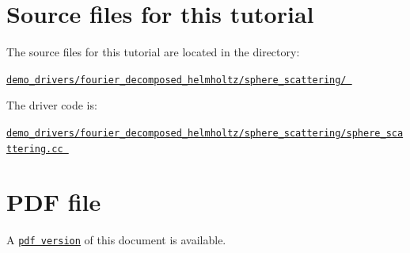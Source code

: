  

\hypertarget{index_sources}{}\section{Source files for this tutorial}\label{index_sources}

\begin{DoxyItemize}
\item The source files for this tutorial are located in the directory\+: \begin{center} \href{../../../../demo_drivers/fourier_decomposed_helmholtz/sphere_scattering}{\tt demo\+\_\+drivers/fourier\+\_\+decomposed\+\_\+helmholtz/sphere\+\_\+scattering/ } \end{center} 
\item The driver code is\+: \begin{center} \href{../../../../demo_drivers/fourier_decomposed_helmholtz/sphere_scattering/sphere_scattering.cc}{\tt demo\+\_\+drivers/fourier\+\_\+decomposed\+\_\+helmholtz/sphere\+\_\+scattering/sphere\+\_\+scattering.\+cc } \end{center} 
\end{DoxyItemize}



 

 \hypertarget{index_pdf}{}\section{P\+D\+F file}\label{index_pdf}
A \href{../latex/refman.pdf}{\tt pdf version} of this document is available. 
